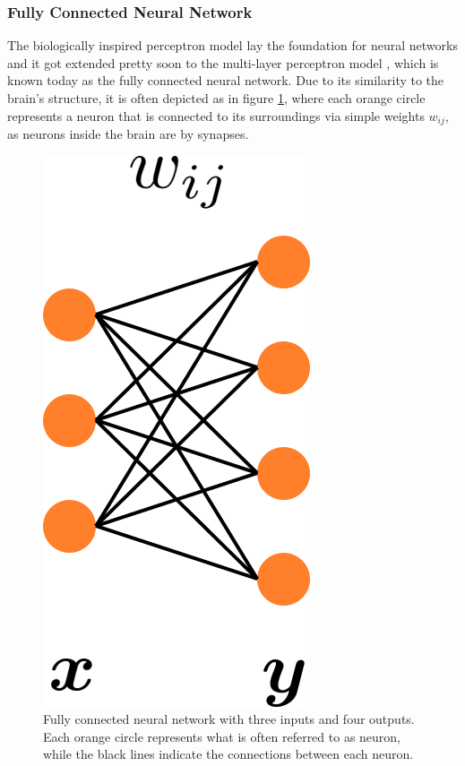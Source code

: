 \subsubsection{Fully Connected Neural Network}
The biologically inspired perceptron model \cite{viglione19704} lay the foundation for neural networks and it got extended pretty soon to the multi-layer perceptron model
\cite{ivakhnenko1971polynomial}, which is known today as the fully connected neural network. Due to its similarity to the brain's structure, it is often depicted as in figure \ref{fig::321_fully_connected}, where each orange circle represents a neuron that is connected to its surroundings via simple weights $w_{ij}$, as neurons inside the brain are by synapses.
\begin{figure}[h!]
	\centering
	\includegraphics[scale=.28]{chapters/03_background/img/fully_connected.png}
	\caption{Fully connected neural network with three inputs and four outputs. Each orange circle represents what is often referred to as neuron, while the black lines indicate the connections between each neuron.}
	\label{fig::321_fully_connected}
\end{figure}
